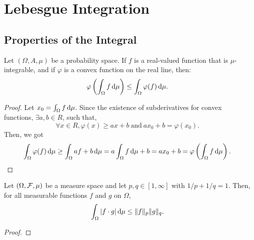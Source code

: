 \chapter{Lebesgue Integration}

\section{Properties of the Integral}

\begin{theorem}
	Let $(\Omega,A,\mu)$ be a probability space. If $f$ is a real-valued function that is $\mu$-integrable, and if $\varphi$ is a convex function on the real line, then:
	\begin{equation}
		\varphi\left(\int_{\Omega}f\mathop{}\!\mathrm{d}\mu\right)\leq\int_{\Omega}\varphi(f)\mathop{}\!\mathrm{d}\mu.
	\end{equation}
\end{theorem}

\begin{proof}
	Let $x_{0}=\int_{\Omega}f\mathop{}\!\mathrm{d}\mu$. Since the existence of subderivatives for convex functions, $\exists a,b\in R$, such that,
	\begin{equation*}
		\forall x\in R,\varphi(x)\geq ax+b\ \text{and}\ ax_0+b=\varphi(x_0).
	\end{equation*}
	Then, we got
	\begin{equation*}
		\int_{\Omega}\varphi(f)\mathop{}\!\mathrm{d}\mu\geq\int_{\Omega}af+b\mathop{}\!\mathrm{d}\mu=a\int_{\Omega}f\mathop{}\!\mathrm{d}\mu+b=ax_0+b=\varphi\left(\int_{\Omega}f\mathop{}\!\mathrm{d}\mu\right).
	\end{equation*}
\end{proof}

\begin{theorem} \label{thm:holder-inequality}
	Let $(\Omega,{\mathcal F},\mu)$ be a measure space and let $p,q\in[1,\infty]$ with $1/p+1/q=1$. Then, for all measurable functions $f$ and $g$ on $\Omega$,
	\begin{equation}
		\int_{\Omega}|f\cdot g|\mathop{}\!\mathrm{d}\mu\leq\|f\|_{p}\|g\|_{q}.
	\end{equation}
\end{theorem}

\begin{proof}

\end{proof}

